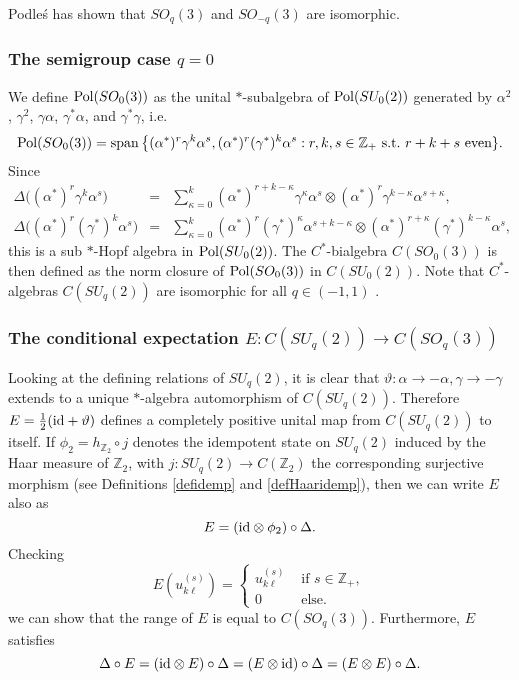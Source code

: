 \documentclass[12pt]{amsart}
\theoremstyle{definition}
\theoremstyle{remark}
\numberwithin{equation}{section}
\begin{document}
Podle\'s  \cite{podles95} has shown that $SO_q(3)$ and $SO_{-q}(3)$ are isomorphic.

\subsubsection{The semigroup case $q=0$} We define ${\rm Pol} (SO_0(3))$ as the
unital $*$-subalgebra of ${\rm Pol} (SU_0(2))$ generated by $\alpha^2$,
$\gamma^2$, $\gamma\alpha$, $\gamma^*\alpha$, and $\gamma^*\gamma$, i.e.\
\[
{\rm Pol} (SO_0(3))={\rm span}\,\big\{(\alpha^*)^r \gamma^k
\alpha^s,(\alpha^*)^r (\gamma^*)^k \alpha^s:
r,k,s\in\mathbb{Z}_+~\mbox{s.t.}~r+k+s\mbox{ even}\}.
\]
Since
\begin{eqnarray*}
\Delta\big((\alpha^*)^r \gamma^k \alpha^s \big) &=& \sum_{\kappa=0}^k
(\alpha^*)^{r+k-\kappa}\gamma^\kappa \alpha^s \otimes (\alpha^*)^r
\gamma^{k-\kappa}\alpha^{s+\kappa}, \\
\Delta\big((\alpha^*)^r (\gamma^*)^k \alpha^s \big) &=& \sum_{\kappa=0}^k
(\alpha^*)^r (\gamma^*)^\kappa \alpha^{s+k-\kappa} \otimes (\alpha^*)^{r+\kappa}
(\gamma^*)^{k-\kappa}\alpha^s,
\end{eqnarray*}
this is a sub $*$-Hopf algebra in ${\rm Pol} (SU_0(2))$. The $C^*$-bialgebra $C(SO_0(3))$ is then defined as the 
norm closure of ${\rm Pol}(SO_0(3))$ in $C(SU_0(2))$. Note that $C^*$-algebras $C(SU_q(2))$ are isomorphic for 
all $q\in (-1,1)$ \cite[Theorem A2.2]{woronowicz87b}.

\subsubsection{The conditional expectation $E:C(SU_q(2))\to C(SO_q(3))$}\label{subsub-cond-exp}
Looking at the defining relations of $SU_q(2)$, it is clear that
$\vartheta:\alpha\to-\alpha,\gamma\to-\gamma$ extends to a unique $*$-algebra
automorphism of $C(SU_q(2))$. Therefore $E=\frac{1}{2}({\rm id}+\vartheta)$
defines a completely positive unital map from $C(SU_q(2))$ to itself. If
$\phi_2=h_{\mathbb{Z}_2}\circ j$ denotes the idempotent state on $SU_q(2)$
induced by the Haar measure of $\mathbb{Z}_2$, with $j:SU_q(2) \to C(\mathbb{Z}_2)$ the corresponding surjective morphism (see Definitions \ref{defidemp} and \ref{defHaaridemp}), then we can write $E$ also as
\[
E=({\rm id}\otimes \phi_2)\circ \Delta.
\]
Checking
\[
E(u^{(s)}_{k\ell}) = \left\{
\begin{array}{cl}
u^{(s)}_{k\ell} & \mbox{ if } s\in\mathbb{Z}_+, \\
0 & \mbox{ else}.
\end{array}\right.
\]
we can show that the range of $E$ is equal to $C(SO_q(3))$. Furthermore, $E$
satisfies
\[
\Delta\circ E = ({\rm id}\otimes E)\circ\Delta = (E\otimes {\rm id})\circ
\Delta = (E\otimes E)\circ \Delta.
\]
\end{document}
